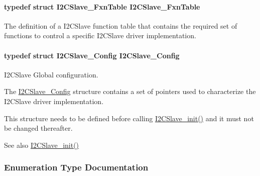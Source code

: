 \paragraph[{I2\+C\+Slave\+\_\+\+Fxn\+Table}]{\setlength{\rightskip}{0pt plus 5cm}typedef struct {\bf I2\+C\+Slave\+\_\+\+Fxn\+Table}  {\bf I2\+C\+Slave\+\_\+\+Fxn\+Table}}\label{_i2_c_slave_8h_a5c5679b810eaceb9aef157fefe2e4608}


The definition of a I2\+C\+Slave function table that contains the required set of functions to control a specific I2\+C\+Slave driver implementation. 

\paragraph[{I2\+C\+Slave\+\_\+\+Config}]{\setlength{\rightskip}{0pt plus 5cm}typedef struct {\bf I2\+C\+Slave\+\_\+\+Config}  {\bf I2\+C\+Slave\+\_\+\+Config}}\label{_i2_c_slave_8h_a8f8cf70723a9a12867dbdb3e12caa300}


I2\+C\+Slave Global configuration. 

The \hyperlink{struct_i2_c_slave___config}{I2\+C\+Slave\+\_\+\+Config} structure contains a set of pointers used to characterize the I2\+C\+Slave driver implementation.

This structure needs to be defined before calling \hyperlink{_i2_c_slave_8h_ad7518283a3f3fb80cefe6cb7ca7a4a36}{I2\+C\+Slave\+\_\+init()} and it must not be changed thereafter.

\begin{DoxySeeAlso}{See also}
\hyperlink{_i2_c_slave_8h_ad7518283a3f3fb80cefe6cb7ca7a4a36}{I2\+C\+Slave\+\_\+init()} 
\end{DoxySeeAlso}


\subsubsection{Enumeration Type Documentation}
